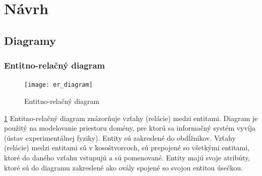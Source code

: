 \documentclass[12pt,a4paper]{article}
\begin{document}
\section{Návrh}

\subsection{Diagramy}

\subsubsection{Entitno-relačný diagram}
\begin{figure}[H]
	\caption{Entitno-relačný diagram}
	\texttt{[image: er\_diagram]}
	\label{fig:er_diagram}
\end{figure}
\ref{fig:er_diagram}
Entitno-relačný diagram znázorňuje vzťahy (relácie) medzi entitami. Diagram je použitý na modelovanie priestoru domény, pre ktorú sa informačný systém vyvíja (ústav experimentálnej fyziky). Entity sú zakreslené do obdĺžnikov. Vzťahy (relácie) medzi entitami sú v kosoštvorcoch, sú prepojené so všetkými entitami, ktoré do daného vzťahu vstupujú a sú pomenované. Entity majú svoje atribúty, ktoré sú do diagramu zakreslené ako ovály spojené so svojou entitou úsečkou.
\end{document}
